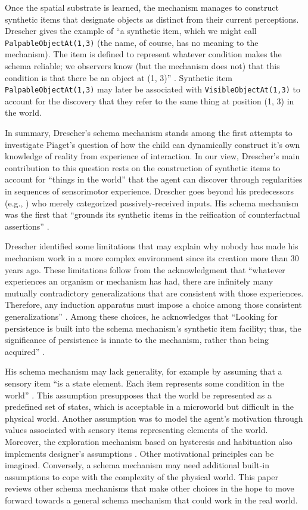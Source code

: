 \documentclass[runningheads]{llncs}
\begin{document}
Once the spatial substrate is learned, the mechanism manages to construct synthetic items that designate objects as distinct from their current perceptions.
Drescher gives the example of ``a synthetic item, which we might call \texttt{PalpableObjectAt(1,3)} (the name, of course, has no meaning to the mechanism). 
The item is defined to represent whatever condition makes the schema reliable; we observers know (but the mechanism does not) that this condition is that there be an object at (1, 3)'' \cite[p. 13]{drescher_made-up_1991}.
Synthetic item \texttt{PalpableObjectAt(1,3)} may later be associated with \texttt{VisibleObjectAt(1,3)} to account for the discovery that they refer to the same thing at position (1, 3) in the world.

In summary, Drescher's schema mechanism stands among the first attempts to investigate Piaget's question of how the child can dynamically construct it's own knowledge of reality from experience of interaction.  
In our view, Drescher's main contribution to this question rests on the construction of synthetic items to account for ``things in the world'' that the agent can discover through regularities in sequences of sensorimotor experience. 
Drescher goes beyond his predecessors (e.g., \cite{harnad_symbol_1990}) who merely categorized passively-received inputs.
His schema mechanism was the first that ``grounds its synthetic items in the reification of counterfactual assertions'' \cite[p. 90]{drescher_made-up_1991}. 

Drescher identified some limitations that may explain why nobody has made his mechanism work in a more complex environment since its creation more than 30 years ago. 
These limitations follow from the acknowledgment that ``whatever experiences an organism or mechanism has had, there are infinitely many mutually contradictory generalizations that are consistent with those experiences. 
Therefore, any induction apparatus must impose a choice among those consistent generalizations'' \cite[p. 174]{drescher_made-up_1991}.
Among these choices, he acknowledges that ``Looking for persistence is built into the schema mechanism's synthetic item facility; thus, the significance of persistence is innate to the mechanism, rather than being acquired'' \cite[p. 84]{drescher_made-up_1991}.

His schema mechanism may lack generality, for example by assuming that a sensory item ``is a state element. Each item represents some condition in the world'' \cite[p. 56]{drescher_made-up_1991}. 
This assumption presupposes that the world be represented as a predefined set of states, which is acceptable in a microworld but difficult in the physical world. 
Another assumption was to model the agent's motivation through values associated with sensory items representing elements of the world. 
Moreover, the exploration mechanism based on hysteresis and habituation also implements designer's assumptions \cite[p. 66]{drescher_made-up_1991}.  
Other motivational principles can be imagined. 
Conversely, a schema mechanism may need additional built-in assumptions to cope with the complexity of the physical world.
This paper reviews other schema mechanisms that make other choices in the hope to move forward towards a general schema mechanism that could work in the real world.
\end{document}
